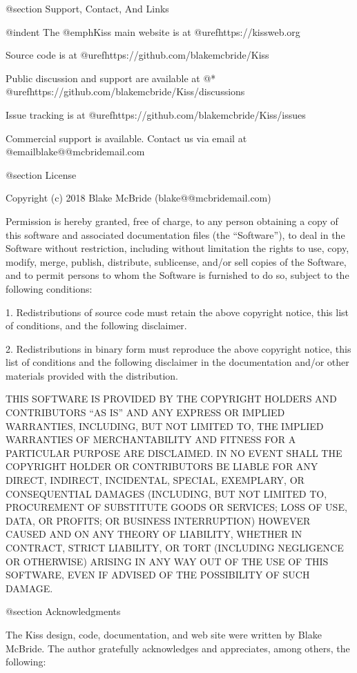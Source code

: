 @section Support, Contact, And Links

@indent
The @emph{Kiss} main website is at @uref{https://kissweb.org}

Source code is at @uref{https://github.com/blakemcbride/Kiss}

Public discussion and support are available at @* 
@uref{https://github.com/blakemcbride/Kiss/discussions}

Issue tracking is at @uref{https://github.com/blakemcbride/Kiss/issues}

Commercial support is available.  Contact us via email at @email{blake@@mcbridemail.com}

@section License

Copyright (c) 2018 Blake McBride (blake@@mcbridemail.com)

Permission is hereby granted, free of charge, to any person obtaining
a copy of this software and associated documentation files (the
``Software''), to deal in the Software without restriction, including
without limitation the rights to use, copy, modify, merge, publish,
distribute, sublicense, and/or sell copies of the Software, and to
permit persons to whom the Software is furnished to do so, subject to
the following conditions:

1. Redistributions of source code must retain the above copyright
notice, this list of conditions, and the following disclaimer.

2. Redistributions in binary form must reproduce the above copyright
notice, this list of conditions and the following disclaimer in the
documentation and/or other materials provided with the distribution.

THIS SOFTWARE IS PROVIDED BY THE COPYRIGHT HOLDERS AND CONTRIBUTORS
``AS IS'' AND ANY EXPRESS OR IMPLIED WARRANTIES, INCLUDING, BUT NOT
LIMITED TO, THE IMPLIED WARRANTIES OF MERCHANTABILITY AND FITNESS FOR
A PARTICULAR PURPOSE ARE DISCLAIMED. IN NO EVENT SHALL THE COPYRIGHT
HOLDER OR CONTRIBUTORS BE LIABLE FOR ANY DIRECT, INDIRECT, INCIDENTAL,
SPECIAL, EXEMPLARY, OR CONSEQUENTIAL DAMAGES (INCLUDING, BUT NOT
LIMITED TO, PROCUREMENT OF SUBSTITUTE GOODS OR SERVICES; LOSS OF USE,
DATA, OR PROFITS; OR BUSINESS INTERRUPTION) HOWEVER CAUSED AND ON ANY
THEORY OF LIABILITY, WHETHER IN CONTRACT, STRICT LIABILITY, OR TORT
(INCLUDING NEGLIGENCE OR OTHERWISE) ARISING IN ANY WAY OUT OF THE USE
OF THIS SOFTWARE, EVEN IF ADVISED OF THE POSSIBILITY OF SUCH DAMAGE.

@section Acknowledgments

The Kiss design, code, documentation, and web site were written by
Blake McBride.  The author gratefully acknowledges and appreciates,
among others, the following:


